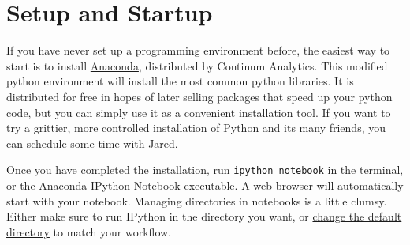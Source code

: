 \documentclass[justified]{tufte-handout}
\makeatletter
\newcommand{\anacondaLink}{https://store.continuum.io/cshop/anaconda/}
\newcommand{\email}{mailto:jgarst@ucdavis.edu}
\newcommand{\customizeDirectoryLink}
  {http://stackoverflow.com/questions/15680463/change-ipython-working-directory}
\makeatother
\begin{document}
\section*{Setup and Startup}
If you have never set up a programming environment before, the easiest way to
start is to install \href{\anacondaLink}{Anaconda}, distributed by Continum
Analytics. This modified python environment will install the most common python
libraries. It is distributed for free in hopes of later selling packages that
speed up your python code, but you can simply use it as a convenient
installation tool. If you want to try a grittier, more controlled installation
of Python and its many friends, you can schedule some time with
\href{\email}{Jared}.

\smallskip
\noindent
Once you have completed the installation, run \texttt{ipython notebook} in the
terminal, or the Anaconda IPython Notebook executable. A web browser will
automatically start with your notebook. Managing directories in notebooks is a
little clumsy. Either make sure to run IPython in the directory you want, or
\href{\customizeDirectoryLink}{change the default directory} to match your
workflow.
\end{document}
